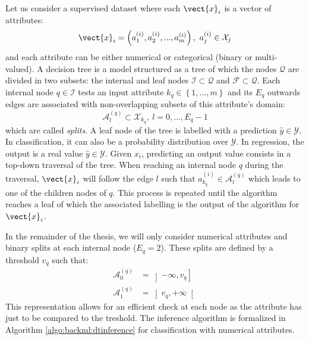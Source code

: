Let us consider a supervised dataset where each $\vect{x}_i$ is a vector of
attributes:
\begin{equation}
\label{eqn:backml:dt:vectattributes}
\vect{x}_i = \left(a^{(i)}_1, a^{(i)}_2, ..., a^{(i)}_m\right),~a^{(i)}_j \in \mathcal{X}_j
\end{equation}
and each attribute can be either numerical or categorical (binary or multi-valued).
A decision tree is a model structured as a tree of which the nodes $\mathcal{Q}$
are divided in two subsets: the internal and leaf nodes $\mathcal{I} \subset \mathcal{Q}$
and $\mathcal{F} \subset \mathcal{Q}$. Each internal node $q \in \mathcal{I}$
tests an input attribute $k_q \in \left\{1,...,m\right\}$ and its $E_q$ outwards
edges are associated with non-overlapping subsets of this attribute's domain:
\begin{equation}
\label{eqn:backml:dt:splitsgeneric}
\mathcal{A}^{(q)}_l \subset \mathcal{X}_{k_q},~l = 0,...,E_q-1
\end{equation}
which are called \textit{splits}. A leaf node of the tree is labelled with a
prediction $\hat{y} \in \mathcal{Y}$. In classification, it can also be a probability
distribution over $\mathcal{Y}$. In regression, the output is a real value
$\hat{y} \in \mathcal{Y}$. Given $x_i$, predicting an output value consists in a
top-down traversal of the tree. When reaching an internal node $q$ during the
traversal, $\vect{x}_i$ will follow the edge $l$ such that $a^{(i)}_{k_q} \in \mathcal{A}^{(q)}_l$
which leads to one of the children nodes of $q$. This process is repeated until
the algorithm reaches a leaf of which the associated labelling is the output of
the algorithm for $\vect{x}_i$.

In the remainder of the thesis, we will only consider numerical attributes and
binary splits at each internal node ($E_q = 2$). These splits are defined by a
threshold $v_q$ such that:
\begin{align}
\label{eqn:backml:dt:splitsbinary}
\mathcal{A}^{(q)}_0 &= \left]-\infty, v_q\right]\\
\mathcal{A}^{(q)}_1 &= \left]v_q, +\infty\right[
\end{align}
This representation allows for an efficient check at each node as the attribute
has just to be compared to the treshold. The inference algorithm is formalized in
Algorithm \ref{algo:backml:dtinference} for classification with numerical
attributes.

